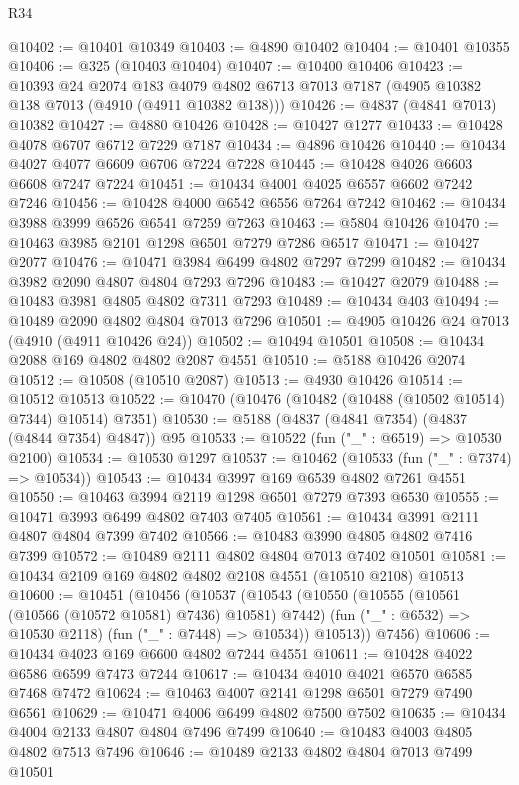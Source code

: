 \begin{lexlean}{R34}
\begin{coremodule}
@10402 := @10401 @10349
@10403 := @4890 @10402
@10404 := @10401 @10355
@10406 := @325 (@10403 @10404)
@10407 := @10400 @10406
@10423 := @10393
    @24
    @2074
    @183
    @4079
    @4802
    @6713
    @7013
    @7187
    (@4905 @10382 @138 @7013 (@4910 (@4911 @10382 @138)))
@10426 := @4837 (@4841 @7013) @10382
@10427 := @4880 @10426
@10428 := @10427 @1277
@10433 := @10428 @4078 @6707 @6712 @7229 @7187
@10434 := @4896 @10426
@10440 := @10434 @4027 @4077 @6609 @6706 @7224 @7228
@10445 := @10428 @4026 @6603 @6608 @7247 @7224
@10451 := @10434 @4001 @4025 @6557 @6602 @7242 @7246
@10456 := @10428 @4000 @6542 @6556 @7264 @7242
@10462 := @10434 @3988 @3999 @6526 @6541 @7259 @7263
@10463 := @5804 @10426
@10470 := @10463 @3985 @2101 @1298 @6501 @7279 @7286 @6517
@10471 := @10427 @2077
@10476 := @10471 @3984 @6499 @4802 @7297 @7299
@10482 := @10434 @3982 @2090 @4807 @4804 @7293 @7296
@10483 := @10427 @2079
@10488 := @10483 @3981 @4805 @4802 @7311 @7293
@10489 := @10434 @403
@10494 := @10489 @2090 @4802 @4804 @7013 @7296
@10501 := @4905 @10426 @24 @7013 (@4910 (@4911 @10426 @24))
@10502 := @10494 @10501
@10508 := @10434 @2088 @169 @4802 @4802 @2087 @4551
@10510 := @5188 @10426 @2074
@10512 := @10508 (@10510 @2087)
@10513 := @4930 @10426
@10514 := @10512 @10513
@10522 := @10470 (@10476 (@10482 (@10488 (@10502 @10514) @7344) @10514) @7351)
@10530 := @5188 (@4837 (@4841 @7354) (@4837 (@4844 @7354) @4847)) @95
@10533 := @10522 (fun ("_" : @6519) => @10530 @2100)
@10534 := @10530 @1297
@10537 := @10462 (@10533 (fun ("_" : @7374) => @10534))
@10543 := @10434 @3997 @169 @6539 @4802 @7261 @4551
@10550 := @10463 @3994 @2119 @1298 @6501 @7279 @7393 @6530
@10555 := @10471 @3993 @6499 @4802 @7403 @7405
@10561 := @10434 @3991 @2111 @4807 @4804 @7399 @7402
@10566 := @10483 @3990 @4805 @4802 @7416 @7399
@10572 := @10489 @2111 @4802 @4804 @7013 @7402 @10501
@10581 := @10434 @2109 @169 @4802 @4802 @2108 @4551 (@10510 @2108) @10513
@10600 := @10451
    (@10456
      (@10537
        (@10543
          (@10550
            (@10555 (@10561 (@10566 (@10572 @10581) @7436) @10581) @7442)
            (fun ("_" : @6532) => @10530 @2118)
            (fun ("_" : @7448) => @10534))
          @10513))
      @7456)
@10606 := @10434 @4023 @169 @6600 @4802 @7244 @4551
@10611 := @10428 @4022 @6586 @6599 @7473 @7244
@10617 := @10434 @4010 @4021 @6570 @6585 @7468 @7472
@10624 := @10463 @4007 @2141 @1298 @6501 @7279 @7490 @6561
@10629 := @10471 @4006 @6499 @4802 @7500 @7502
@10635 := @10434 @4004 @2133 @4807 @4804 @7496 @7499
@10640 := @10483 @4003 @4805 @4802 @7513 @7496
@10646 := @10489 @2133 @4802 @4804 @7013 @7499 @10501

\end{coremodule}
\end{lexlean}

